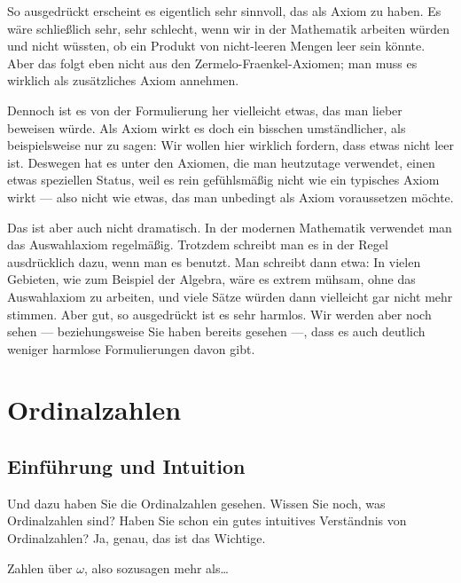 \begin{spoken-clean}[00:03:50 - 00:05:29]
So ausgedrückt erscheint es eigentlich sehr sinnvoll, das als Axiom zu haben. Es wäre schließlich sehr, sehr schlecht, wenn wir in der Mathematik arbeiten würden und nicht wüssten, ob ein Produkt von nicht-leeren Mengen leer sein könnte. Aber das folgt eben nicht aus den Zermelo-Fraenkel-Axiomen; man muss es wirklich als zusätzliches Axiom annehmen.

Dennoch ist es von der Formulierung her vielleicht etwas, das man lieber beweisen würde. Als Axiom wirkt es doch ein bisschen umständlicher, als beispielsweise nur zu sagen:  Wir wollen hier wirklich fordern, dass etwas nicht leer ist. Deswegen hat es unter den Axiomen, die man heutzutage verwendet, einen etwas speziellen Status, weil es rein gefühlsmäßig nicht wie ein typisches Axiom wirkt --- also nicht wie etwas, das man unbedingt als Axiom voraussetzen möchte.

Das ist aber auch nicht dramatisch. In der modernen Mathematik verwendet man das Auswahlaxiom regelmäßig. Trotzdem schreibt man es in der Regel ausdrücklich dazu, wenn man es benutzt. Man schreibt dann etwa:  In vielen Gebieten, wie zum Beispiel der Algebra, wäre es extrem mühsam, ohne das Auswahlaxiom zu arbeiten, und viele Sätze würden dann vielleicht gar nicht mehr stimmen. Aber gut, so ausgedrückt ist es sehr harmlos. Wir werden aber noch sehen --- beziehungsweise Sie haben bereits gesehen ---, dass es auch deutlich weniger harmlose Formulierungen davon gibt.
\end{spoken-clean}

\section{Ordinalzahlen}
\subsection{Einführung und Intuition}

\begin{spoken-clean}[00:05:29 - 00:05:53]
Und dazu haben Sie die Ordinalzahlen gesehen. Wissen Sie noch, was Ordinalzahlen sind? Haben Sie schon ein gutes intuitives Verständnis von Ordinalzahlen? Ja, genau, das ist das Wichtige.
\end{spoken-clean}

\begin{student-interaction}[Studentenantwort]
Zahlen über $\omega$, also sozusagen mehr als\dots
\end{student-interaction}

